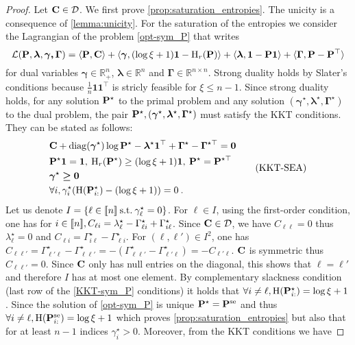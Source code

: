 \begin{proof}
Let $\mathbf{C} \in \mathcal{D}$. We first prove \cref{prop:saturation_entropies}. The unicity is a consequence of \cref{lemma:unicity}. For the saturation of the entropies we consider the Lagrangian of the problem \eqref{opt-sym_P} that writes $$\mathcal{L}({\mathbf{P}}, \bm{\lambda}, \bm{\gamma, \bm{\Gamma}}) = \langle {\mathbf{P}}, \mathbf{C} \rangle + \langle \bm{\gamma}, (\log{\xi}+1) \bm{1} - \operatorname{H}_r({\mathbf{P}}) \rangle + \langle \bm{\lambda}, \bm{1} - {\mathbf{P}} \bm{1} \rangle + \langle \bm{\Gamma}, {\mathbf{P}} - {\mathbf{P}}^\top \rangle$$ for dual variables $\bm{\gamma} \in \mathbb{R}_+^n$, $\bm{\lambda} \in \mathbb{R}^n$ and $\bm{\Gamma} \in \mathbb{R}^{n \times n}$. Strong duality holds by Slater's conditions because $\frac{1}{n} \bm{1} \bm{1}^{\top}$ is stricly feasible for $\xi \leq n-1$. Since strong duality holds, for any solution ${\mathbf{P}}^\star$ to the primal problem and any solution $(\bm{\gamma}^\star, \bm{\lambda}^\star, \bm{\Gamma}^\star)$ to the dual problem, the pair ${\mathbf{P}}^\star, (\bm{\gamma}^\star, \bm{\lambda}^\star, \bm{\Gamma}^\star)$ must satisfy the KKT conditions. They can be stated as follows:
\begin{equation}
    \begin{aligned}
    &\mathbf{C} + \operatorname{diag}(\bm{\gamma}^\star)\log{{\mathbf{P}}^\star} - \bm{\lambda}^\star \bm{1}^\top + \bm{\Gamma}^\star - \bm{\Gamma}^{\star\top} = \bm{0} \\
    &{\mathbf{P}}^\star \bm{1} = \bm{1}, \: \operatorname{H}_r({\mathbf{P}}^\star) \geq (\log{\xi} + 1)\bm{1}, \: {\mathbf{P}}^\star = {\mathbf{P}}^{\star \top} \\
    &\bm{\gamma}^\star \bm{\geq} \bm{0} \\
    &\forall i, \gamma_i^\star (\operatorname{H}({\mathbf{P}}_{i:}^\star) - (\log{\xi} + 1)) = 0\:.
\end{aligned}
\tag{KKT-SEA}\label{KKT-sym_P}
\end{equation}
Let us denote $I = \{\ell \in {[\![n]\!]} \: \text{s.t.} \: \gamma_\ell^\star = 0\}$. For $\ell \in I$, using the first-order condition, one has for $i \in {[\![n]\!]}, C_{\ell i} = \lambda^\star_\ell - \Gamma^\star_{\ell i} + \Gamma^{\star}_{i \ell}$. Since $\mathbf{C} \in \mathcal{D}$, we have $C_{\ell \ell} = 0$ thus $\lambda^\star_\ell = 0$ and $C_{\ell i} = \Gamma^\star_{i \ell} - \Gamma^{\star}_{\ell i}$.
For $(\ell, \ell') \in I^2$, one has $C_{\ell \ell'} = \Gamma^\star_{\ell' \ell} - \Gamma^{\star}_{\ell \ell'} = - (\Gamma^{\star}_{\ell \ell'} - \Gamma^\star_{\ell' \ell}) = - C_{\ell' \ell}$. $\mathbf{C}$ is symmetric thus $C_{\ell \ell'}=0$. Since $\mathbf{C}$ only has null entries on the diagonal, this shows that $\ell = \ell'$ and therefore $I$ has at most one element. By complementary slackness condition (last row of the \ref{KKT-sym_P} conditions) it holds that $\forall i \neq \ell, \operatorname{H}({\mathbf{P}}^{\star}_{i:}) = \log \xi + 1$. Since the solution of \eqref{opt-sym_P} is unique ${\mathbf{P}}^\star = {\mathbf{P}}^{\mathrm{se}}$ and thus $\forall i \neq \ell, \operatorname{H}({\mathbf{P}}^{\mathrm{se}}_{i:}) = \log \xi + 1$ which proves \cref{prop:saturation_entropies} but also that for at least $n-1$ indices $\gamma_i^\star > 0$. Moreover, from the KKT conditions we have

\end{proof}
